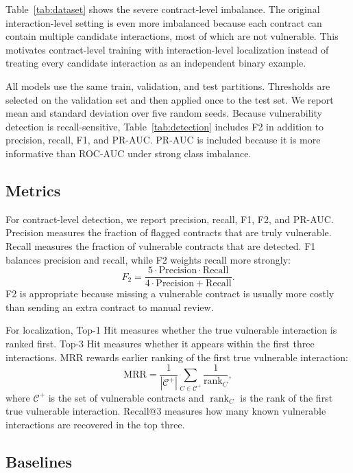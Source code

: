 \documentclass[conference]{IEEEtran}
\begin{document}
Table~\ref{tab:dataset} shows the severe contract-level imbalance. The original interaction-level setting is even more imbalanced because each contract can contain multiple candidate interactions, most of which are not vulnerable. This motivates contract-level training with interaction-level localization instead of treating every candidate interaction as an independent binary example.

All models use the same train, validation, and test partitions. Thresholds are selected on the validation set and then applied once to the test set. We report mean and standard deviation over five random seeds. Because vulnerability detection is recall-sensitive, Table~\ref{tab:detection} includes F2 in addition to precision, recall, F1, and PR-AUC. PR-AUC is included because it is more informative than ROC-AUC under strong class imbalance.

\subsection{Metrics}

For contract-level detection, we report precision, recall, F1, F2, and PR-AUC. Precision measures the fraction of flagged contracts that are truly vulnerable. Recall measures the fraction of vulnerable contracts that are detected. F1 balances precision and recall, while F2 weights recall more strongly:
\begin{equation}
F_2 = \frac{5\cdot \mathrm{Precision}\cdot \mathrm{Recall}}
{4\cdot \mathrm{Precision}+\mathrm{Recall}}.
\end{equation}
F2 is appropriate because missing a vulnerable contract is usually more costly than sending an extra contract to manual review.

For localization, Top-1 Hit measures whether the true vulnerable interaction is ranked first. Top-3 Hit measures whether it appears within the first three interactions. MRR rewards earlier ranking of the first true vulnerable interaction:
\begin{equation}
\mathrm{MRR}=\frac{1}{|\mathcal{C}^{+}|}\sum_{C\in\mathcal{C}^{+}}\frac{1}{\operatorname{rank}_C},
\end{equation}
where $\mathcal{C}^{+}$ is the set of vulnerable contracts and $\operatorname{rank}_C$ is the rank of the first true vulnerable interaction. Recall@3 measures how many known vulnerable interactions are recovered in the top three.

\subsection{Baselines}
\end{document}
